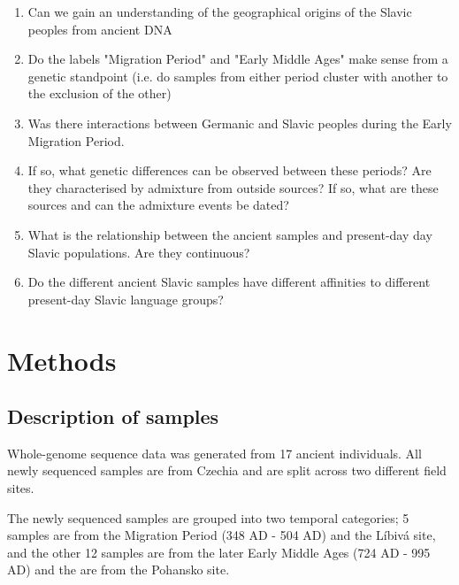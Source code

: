 \begin{enumerate}
\item Can we gain an understanding of the geographical origins of the Slavic peoples from ancient DNA
\item Do the labels "Migration Period" and "Early Middle Ages" make sense from a genetic standpoint (i.e. do samples from either period cluster with another to the exclusion of the other)
\item Was there interactions between Germanic and Slavic peoples during the Early Migration Period. 
\item If so, what genetic differences can be observed between these periods? Are they characterised by admixture from outside sources? If so, what are these sources and can the admixture events be dated?
\item What is the relationship between the ancient samples and present-day day Slavic populations. Are they continuous?
\item Do the different ancient Slavic samples have different affinities to different present-day Slavic language groups?
\end{enumerate}


\section{Methods}

\subsection{Description of samples}

Whole-genome sequence data was generated from 17 ancient individuals. All newly sequenced samples are from Czechia and are split across two different field sites. 

The newly sequenced samples are grouped into two temporal categories; 5 samples are from the Migration Period (348 AD - 504 AD) and the Líbivá site, and the other 12 samples are from the later Early Middle Ages (724 AD - 995 AD) and the are from the  Pohansko site. 

